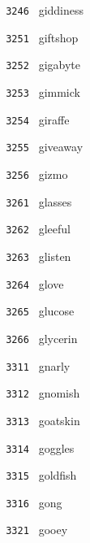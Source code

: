 \documentclass[11pt]{article}
\begin{document}
\begin{multicols}{6}
\noindent \texttt{ 3246 } \hspace{1mm} giddiness  \par
\noindent \texttt{ 3251 } \hspace{1mm} giftshop  \par
\noindent \texttt{ 3252 } \hspace{1mm} gigabyte  \par
\noindent \texttt{ 3253 } \hspace{1mm} gimmick  \par
\noindent \texttt{ 3254 } \hspace{1mm} giraffe  \par
\noindent \texttt{ 3255 } \hspace{1mm} giveaway  \par
\noindent \texttt{ 3256 } \hspace{1mm} gizmo  \par
\noindent \texttt{ 3261 } \hspace{1mm} glasses  \par
\noindent \texttt{ 3262 } \hspace{1mm} gleeful  \par
\noindent \texttt{ 3263 } \hspace{1mm} glisten  \par
\noindent \texttt{ 3264 } \hspace{1mm} glove  \par
\noindent \texttt{ 3265 } \hspace{1mm} glucose  \par
\noindent \texttt{ 3266 } \hspace{1mm} glycerin  \par
\noindent \texttt{ 3311 } \hspace{1mm} gnarly  \par
\noindent \texttt{ 3312 } \hspace{1mm} gnomish  \par
\noindent \texttt{ 3313 } \hspace{1mm} goatskin  \par
\noindent \texttt{ 3314 } \hspace{1mm} goggles  \par
\noindent \texttt{ 3315 } \hspace{1mm} goldfish  \par
\noindent \texttt{ 3316 } \hspace{1mm} gong  \par
\noindent \texttt{ 3321 } \hspace{1mm} gooey  \par

\end{multicols}
\end{document}
